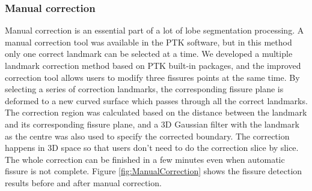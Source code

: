{\subsubsection{Manual correction}
Manual correction is an essential part of a lot of lobe segmentation processing. A manual correction tool was available in the PTK software, but in this method only one correct landmark can be selected at a time. We developed a multiple landmark correction method based on PTK built-in packages, and the improved correction tool allows users to modify three fissures points at the same time. By selecting a series of correction landmarks, the corresponding fissure plane is deformed to a new curved surface which passes through all the correct landmarks. The correction region was calculated based on the distance between the landmark and its corresponding fissure plane, and a 3D Gaussian filter with the landmark as the centre was also used to specify the corrected boundary. The correction happens in 3D space so that users don't need to do the correction slice by slice. The whole correction can be finished in a few minutes even when automatic fissure is not complete. Figure \ref{fig:ManualCorrection} shows the fissure detection results before and after manual correction.

}
